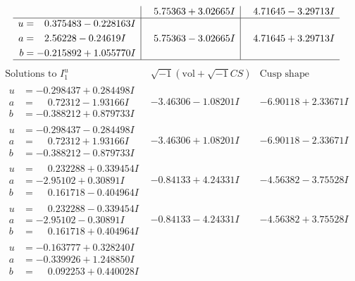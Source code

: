 \documentclass[1p]{elsarticle_modified}
\theoremstyle{definition}
\newcommand{\I}{\sqrt{-1}}
\begin{document}
$$\begin{array}{c|c|c}
 & \phantom{-}5.75363 + 3.02665 I & \phantom{-}4.71645 - 3.29713 I \\ \hline\begin{aligned}
u &= \phantom{-}0.375483 - 0.228163 I \\
a &= \phantom{-}2.56228 - 0.24619 I \\
b &= -0.215892 + 1.055770 I\end{aligned}
 & \phantom{-}5.75363 - 3.02665 I & \phantom{-}4.71645 + 3.29713 I\\
 \hline 
 \end{array}$$\newpage$$\begin{array}{c|c|c}  
\text{Solutions to }I^u_{1}& \I (\text{vol} + \sqrt{-1}CS) & \text{Cusp shape}\\
 \hline 
\begin{aligned}
u &= -0.298437 + 0.284498 I \\
a &= \phantom{-}0.72312 - 1.93166 I \\
b &= -0.388212 + 0.879733 I\end{aligned}
 & -3.46306 - 1.08201 I & -6.90118 + 2.33671 I \\ \hline\begin{aligned}
u &= -0.298437 - 0.284498 I \\
a &= \phantom{-}0.72312 + 1.93166 I \\
b &= -0.388212 - 0.879733 I\end{aligned}
 & -3.46306 + 1.08201 I & -6.90118 - 2.33671 I \\ \hline\begin{aligned}
u &= \phantom{-}0.232288 + 0.339454 I \\
a &= -2.95102 + 0.30891 I \\
b &= \phantom{-}0.161718 - 0.404964 I\end{aligned}
 & -0.84133 + 4.24331 I & -4.56382 - 3.75528 I \\ \hline\begin{aligned}
u &= \phantom{-}0.232288 - 0.339454 I \\
a &= -2.95102 - 0.30891 I \\
b &= \phantom{-}0.161718 + 0.404964 I\end{aligned}
 & -0.84133 - 4.24331 I & -4.56382 + 3.75528 I \\ \hline\begin{aligned}
u &= -0.163777 + 0.328240 I \\
a &= -0.339926 + 1.248850 I \\
b &= \phantom{-}0.092253 + 0.440028 I\end{aligned}

\end{array}$$
\end{document}
